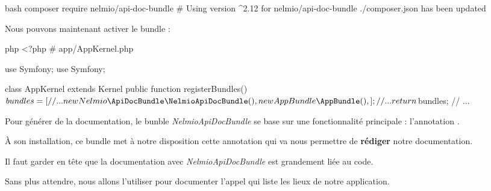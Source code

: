 \documentclass[big]{zmdocument}
\begin{document}
\begin{CodeBlock}{bash}
composer require nelmio/api-doc-bundle
# Using version ^2.12 for nelmio/api-doc-bundle
./composer.json has been updated
\end{CodeBlock}



Nous pouvons maintenant activer le bundle :



\begin{CodeBlock}{php}
<?php
# app/AppKernel.php

use Symfony\Component\HttpKernel\Kernel;
use Symfony\Component\Config\Loader\LoaderInterface;

class AppKernel extends Kernel
{
    public function registerBundles()
    {
        $bundles = [
            // ...
            new Nelmio\ApiDocBundle\NelmioApiDocBundle(),
            new AppBundle\AppBundle(),
        ];

       // ...
        return $bundles;
    }
// ...
}
\end{CodeBlock}







Pour générer de la documentation, le bunble \textit{NelmioApiDocBundle} se base sur une fonctionnalité principale : l'annotation .



À son installation, ce bundle met à notre disposition cette annotation qui va nous permettre de \textbf{rédiger} notre documentation.



\begin{Information}
Il faut garder en tête que la documentation avec \textit{NelmioApiDocBundle} est grandement liée au code.
\end{Information}


Sans plus attendre, nous allons l'utiliser pour documenter l'appel qui liste les lieux de notre application.
\end{document}
